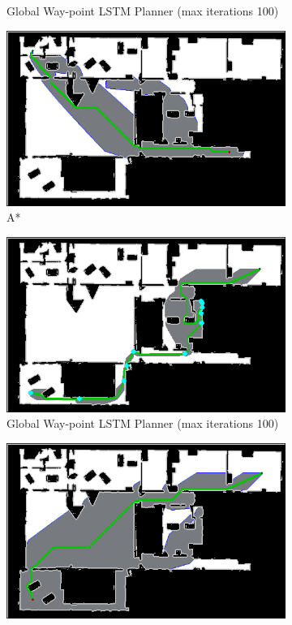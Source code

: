 \begin{figure}[]
\begin{subfigure}[b]{0.48\linewidth}
     \caption{Global Way-point LSTM Planner (max iterations 100)}
  \end{subfigure}
  \hfill
  \begin{subfigure}[b]{0.48\linewidth}
    \includegraphics[width=\linewidth]{images/screenshot_109.png}
     \caption{A*\newline}
  \end{subfigure}
  \hfill
  \begin{subfigure}[b]{0.48\linewidth}
    \includegraphics[width=\linewidth]{images/screenshot_138.png}
     \caption{Global Way-point LSTM Planner (max iterations 100)}
  \end{subfigure}
  \hfill
  \begin{subfigure}[b]{0.48\linewidth}
    \includegraphics[width=\linewidth]{images/screenshot_110.png}

\end{subfigure}
\end{figure}
